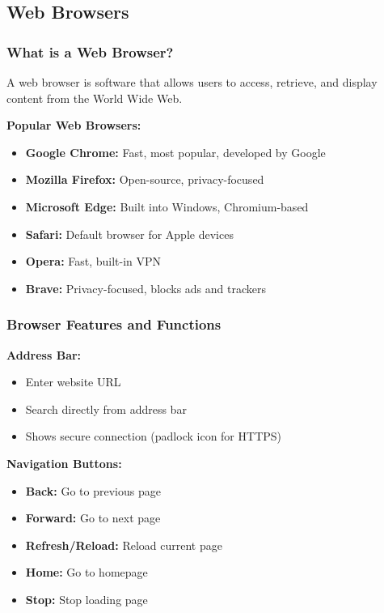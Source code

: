\documentclass[12pt,a4paper]{article}
\begin{document}
\subsection{Web Browsers}

\subsubsection{What is a Web Browser?}
A web browser is software that allows users to access, retrieve, and display content from the World Wide Web.

\textbf{Popular Web Browsers:}
\begin{itemize}
    \item \textbf{Google Chrome:} Fast, most popular, developed by Google
    \item \textbf{Mozilla Firefox:} Open-source, privacy-focused
    \item \textbf{Microsoft Edge:} Built into Windows, Chromium-based
    \item \textbf{Safari:} Default browser for Apple devices
    \item \textbf{Opera:} Fast, built-in VPN
    \item \textbf{Brave:} Privacy-focused, blocks ads and trackers
\end{itemize}

\subsubsection{Browser Features and Functions}

\textbf{Address Bar:}
\begin{itemize}
    \item Enter website URL
    \item Search directly from address bar
    \item Shows secure connection (padlock icon for HTTPS)
\end{itemize}

\textbf{Navigation Buttons:}
\begin{itemize}
    \item \textbf{Back:} Go to previous page
    \item \textbf{Forward:} Go to next page
    \item \textbf{Refresh/Reload:} Reload current page
    \item \textbf{Home:} Go to homepage
    \item \textbf{Stop:} Stop loading page
\end{itemize}
\end{document}

